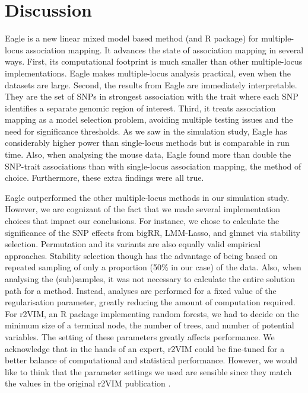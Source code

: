 \documentclass{article}
\begin{document}
\section{Discussion}
Eagle is a new linear mixed model based method (and R package) for multiple-locus association mapping. It advances the state of association mapping in several ways. 
First, its computational footprint is much smaller than other multiple-locus implementations. Eagle makes multiple-locus analysis 
practical, even when the datasets are large. Second, the results from
 Eagle are immediately interpretable. They are the set of SNPs in strongest association with the trait where 
each SNP identifies a separate genomic region of interest. Third, it treats association mapping as a model selection problem, avoiding 
multiple testing issues and the need for significance thresholds. 
 As we saw in the simulation study, Eagle has considerably higher power than single-locus methods but is comparable in run time.
Also, when analysing the mouse data, Eagle found more than double the SNP-trait associations than 
with single-locus association mapping, the method of choice. Furthermore, these extra findings were all true. 

Eagle outperformed the other multiple-locus methods in our simulation study. However, we are cognizant of the fact  that we made several implementation 
choices that impact our conclusions.  For instance, we chose to calculate the significance of the 
SNP effects from bigRR, LMM-Lasso, and glmnet via stability selection.  Permutation and its variants \cite{ browning2008presto, pahl2010permory  } are also equally valid empirical approaches. Stability selection though has the advantage of being based on repeated sampling of only a proportion (50\% in our case) of the 
data. Also, when analysing the (sub)samples, it was not necessary to calculate the entire solution path for a method. 
 Instead,  analyses are 
performed for a fixed value of the regularisation parameter, greatly reducing the amount of computation required. For r2VIM, an R package 
implementing random forests, we had to decide on the  minimum size of a terminal node, the number of trees, and number of potential variables. 
The setting of these parameters greatly affects performance.  We  acknowledge that in the hands of an expert, 
r2VIM could be fine-tuned for a better balance of computational and statistical performance. 
However, we would like to think that the parameter settings we used are sensible 
since they match the values in the original r2VIM publication \cite{szymczak2016r2vim}.
\end{document}
